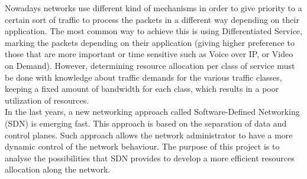 Nowadays networks use different kind of mechanisms in order to give priority to a certain sort of traffic to process the packets in a different way depending on their application. The most common way to achieve this is using Differentiated Service, marking the packets depending on their application (giving higher preference to those that are more important or time sensitive such as Voice over IP, or Video on Demand). However, determining resource allocation per class of service must be done with knowledge about traffic demands for the various traffic classes, keeping a fixed amount of bandwidth for each class, which results in a poor utilization of resources.\\

In the last years, a new networking approach called Software-Defined Networking (SDN) is emerging fast. This approach is based on the separation of data and control planes. Such approach allows the network administrator to have a more dynamic control of the network behaviour.
The purpose of this project is to analyse the possibilities that SDN provides to develop a more efficient resources allocation along the network.
